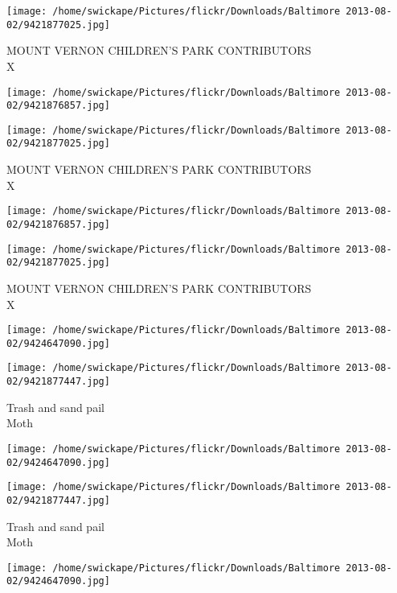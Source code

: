 \documentclass[10pt,letterpaper]{article}
\begin{document}
\vspace{0.25in}
\texttt{[image: /home/swickape/Pictures/flickr/Downloads/Baltimore 2013-08-02/9421877025.jpg]}

MOUNT VERNON CHILDREN'S PARK CONTRIBUTORS\\
X\\
\pagebreak

\texttt{[image: /home/swickape/Pictures/flickr/Downloads/Baltimore 2013-08-02/9421876857.jpg]}

\vspace{0.25in}
\texttt{[image: /home/swickape/Pictures/flickr/Downloads/Baltimore 2013-08-02/9421877025.jpg]}

MOUNT VERNON CHILDREN'S PARK CONTRIBUTORS\\
X\\
\pagebreak

\texttt{[image: /home/swickape/Pictures/flickr/Downloads/Baltimore 2013-08-02/9421876857.jpg]}

\vspace{0.25in}
\texttt{[image: /home/swickape/Pictures/flickr/Downloads/Baltimore 2013-08-02/9421877025.jpg]}

MOUNT VERNON CHILDREN'S PARK CONTRIBUTORS\\
X\\
\pagebreak

\texttt{[image: /home/swickape/Pictures/flickr/Downloads/Baltimore 2013-08-02/9424647090.jpg]}

\vspace{0.25in}
\texttt{[image: /home/swickape/Pictures/flickr/Downloads/Baltimore 2013-08-02/9421877447.jpg]}

Trash and sand pail\\
Moth\\
\pagebreak

\texttt{[image: /home/swickape/Pictures/flickr/Downloads/Baltimore 2013-08-02/9424647090.jpg]}

\vspace{0.25in}
\texttt{[image: /home/swickape/Pictures/flickr/Downloads/Baltimore 2013-08-02/9421877447.jpg]}

Trash and sand pail\\
Moth\\
\pagebreak

\texttt{[image: /home/swickape/Pictures/flickr/Downloads/Baltimore 2013-08-02/9424647090.jpg]}
\end{document}
